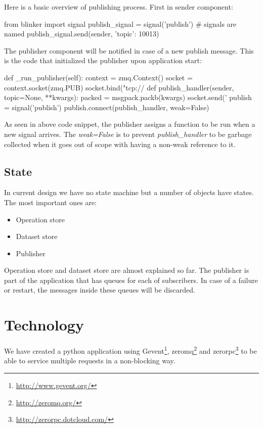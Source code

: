 Here is a basic overview of publishing process. First in sender component:

\begin{python}
from blinker import signal
publish_signal = signal('publish') # signals are named
publish_signal.send(sender, {'topic': 10013})
\end{python}

The publisher component will be notified in case of a new publish message. 
This is the code that initialized the publisher upon application start:
\begin{python}
def _run_publisher(self):
    context = zmq.Context()
    socket = context.socket(zmq.PUB)
    socket.bind("tcp://%
    def publish_handler(sender, topic=None, **kwargs):
	packed = msgpack.packb(kwargs)
	socket.send('%
    publish = signal('publish')
    publish.connect(publish_handler, weak=False)
\end{python}

As seen in above code snippet, the publisher assigns a function to be run when
a new signal arrives. The \textit{weak=False} is to prevent \textit{publish\_handler}
to be garbage collected when it goes out of scope with having a non-weak reference to it.

\subsection{State}
In current design we have no state machine but a number of objects have states.
The most important ones are:
\begin{itemize}
\item Operation store
\item Dataset store
\item Publisher
\end{itemize}

Operation store and dataset store are almost explained so far. 
The publisher is part of the application that has queues for each of subscribers.
In case of a failure or restart, the messages inside these queues will be discarded.

\section{Technology}
We have created a python application using Gevent\footnote{\url{http://www.gevent.org/}},
zeromq\footnote{\url{http://zeromq.org/}} and zerorpc\footnote{\url{http://zerorpc.dotcloud.com/}} 
to be able to service multiple requests in a non-blocking way.

